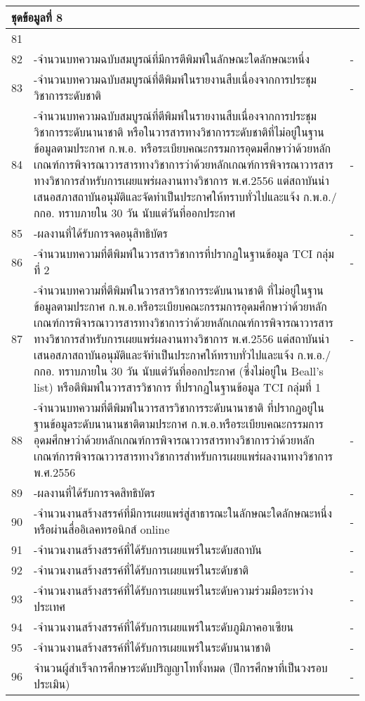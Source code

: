 \begin{longtable}{|c|p{}|c|}
	\multicolumn{3}{|l|}{\textbf{ชุดข้อมูลที่ 8}}\\\hline
	81&\cellcolor{red!10}{จำนวนรวมของผลงานนักศึกษาและผู้สำเร็จการศึกษาในระดับปริญญาโทที่ได้รับการตีพิมพ์หรือเผยแพร่}&\cellcolor{red!10}{\textbf{-}}\\\hline
	82&-จำนวนบทความฉบับสมบูรณ์ที่มีการตีพิมพ์ในลักษณะใดลักษณะหนึ่ง &-\\\hline
	83&-จำนวนบทความฉบับสมบูรณ์ที่ตีพิมพ์ในรายงานสืบเนื่องจากการประชุมวิชาการระดับชาติ&-\\\hline
	84&-จำนวนบทความฉบับสมบูรณ์ที่ตีพิมพ์ในรายงานสืบเนื่องจากการประชุมวิชาการระดับนานาชาติ หรือในวารสารทางวิชาการระดับชาติที่ไม่อยู่ในฐานข้อมูลตามประกาศ ก.พ.อ. หรือระเบียบคณะกรรมการอุดมศึกษาว่าด้วยหลักเกณฑ์การพิจารณาวารสารทางวิชาการว่าด้วยหลักเกณฑ์การพิจารณาวารสารทางวิชาการสำหรับการเผยแพร่ผลงานทางวิชาการ พ.ศ.2556 แต่สถาบันนำเสนอสภาสถาบันอนุมัติและจัดทำเป็นประกาศให้ทราบทั่วไปและแจ้ง ก.พ.อ./กกอ. ทราบภายใน 30 วัน  นับแต่วันที่ออกประกาศ&-\\\hline
	85&-ผลงานที่ได้รับการจดอนุสิทธิบัตร&-\\\hline
	86&-จำนวนบทความที่ตีพิมพ์ในวารสารวิชาการที่ปรากฏในฐานข้อมูล TCI กลุ่มที่ 2&-\\\hline
	87&-จำนวนบทความที่ตีพิมพ์ในวารสารวิชาการระดับนานาชาติ ที่ไม่อยู่ในฐานข้อมูลตามประกาศ ก.พ.อ.หรือระเบียบคณะกรรมการอุดมศึกษาว่าด้วยหลักเกณฑ์การพิจารณาวารสารทางวิชาการว่าด้วยหลักเกณฑ์การพิจารณาวารสารทางวิชาการสำหรับการเผยแพร่ผลงานทางวิชาการ พ.ศ.2556 แต่สถาบันนำเสนอสภาสถาบันอนุมัติและจัทำเป็นประกาศให้ทราบทั่วไปและแจ้ง ก.พ.อ./กกอ. ทราบภายใน 30 วัน  นับแต่วันที่ออกประกาศ (ซึ่งไม่อยู่ใน Beall's list) หรือตีพิมพ์ในวารสารวิชาการ ที่ปรากฏในฐานข้อมูล TCI กลุ่มที่ 1&-\\\hline
	88&-จำนวนบทความที่ตีพิมพ์ในวารสารวิชาการระดับนานาชาติ ที่ปรากฏอยู่ในฐานข้อมูลระดับนานานชาติตามประกาศ ก.พ.อ.หรือระเบียบคณะกรรมการอุดมศึกษาว่าด้วยหลักเกณฑ์การพิจารณาวารสารทางวิชาการว่าด้วยหลักเกณฑ์การพิจารณาวารสารทางวิชาการสำหรับการเผยแพร่ผลงานทางวิชาการ พ.ศ.2556&-\\\hline
	89&-ผลงานที่ได้รับการจดสิทธิบัตร&-\\\hline
	90&-จำนวนงานสร้างสรรค์ที่มีการเผยแพร่สู่สาธารณะในลักษณะใดลักษณะหนึ่ง หรือผ่านสื่ออิเลคทรอนิกส์ online&-\\\hline
	91&-จำนวนงานสร้างสรรค์ที่ได้รับการเผยแพร่ในระดับสถาบัน&-\\\hline
	92&-จำนวนงานสร้างสรรค์ที่ได้รับการเผยแพร่ในระดับชาติ&-\\\hline
	93&-จำนวนงานสร้างสรรค์ที่ได้รับการเผยแพร่ในระดับความร่วมมือระหว่างประเทศ&-\\\hline
	94&-จำนวนงานสร้างสรรค์ที่ได้รับการเผยแพร่ในระดับภูมิภาคอาเซียน&-\\\hline
	95&-จำนวนงานสร้างสรรค์ที่ได้รับการเผยแพร่ในระดับนานาชาติ &-\\\hline
	96&จำนวนผู้สำเร็จการศึกษาระดับปริญญาโททั้งหมด (ปีการศึกษาที่เป็นวงรอบประเมิน)&-\\\hline
	

\end{longtable}
